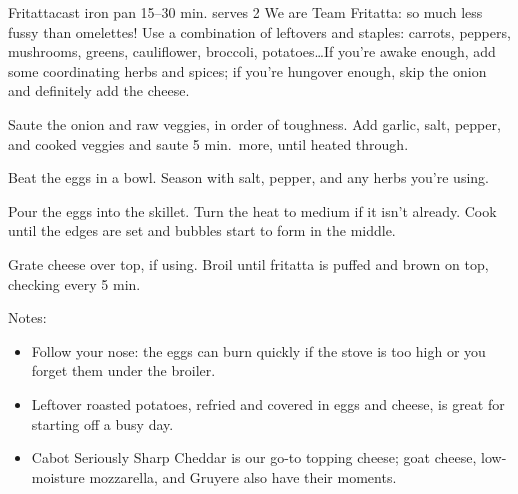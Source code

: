 \begin{recipe}{Fritatta}{cast iron pan \hfill 15--30 min.}{ \hfill serves 2}
 \freeform We are Team Fritatta: so much less fussy than omelettes! Use a combination of leftovers and staples: carrots, peppers, mushrooms, greens, cauliflower, broccoli, potatoes\ldots If you're awake enough, add some coordinating herbs and spices; if you're hungover enough, skip the onion and definitely add the cheese.

 Saute the onion and raw veggies, in order of toughness. Add garlic, salt, pepper, and cooked veggies and saute 5 min.\ more, until heated through.

 Beat the eggs in a bowl. Season with salt, pepper, and any herbs you're using.

 \newstep Pour the eggs into the skillet. Turn the heat to medium if it isn't already. Cook until the edges are set and bubbles start to form in the middle.

 Grate cheese over top, if using. Broil until fritatta is puffed and brown on top, checking every 5 min.

 \freeform Notes:
 \begin{itemize}
  \item Follow your nose: the eggs can burn quickly if the stove is too high or you forget them under the broiler.
  \item Leftover roasted potatoes, refried and covered in eggs and cheese, is great for starting off a busy day.
  \item Cabot Seriously Sharp Cheddar is our go-to topping cheese; goat cheese, low-moisture mozzarella, and Gruyere also have their moments.
 \end{itemize}
\end{recipe}
